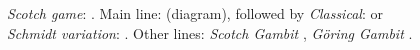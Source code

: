 \begin{figure}[H]
\begin{minipage}[b]{.246\linewidth}
\begin{framed}
\raggedright
\newgame
\emph{Scotch game}: .
Main line:  (diagram), followed by \emph{Classical}:  or \emph{Schmidt variation}: .
Other lines: \emph{Scotch Gambit} , \emph{Göring Gambit} .
\begin{center}
\scalebox{0.7}{\showboard}
\end{center}
\end{framed}
\end{minipage}
\end{figure}

